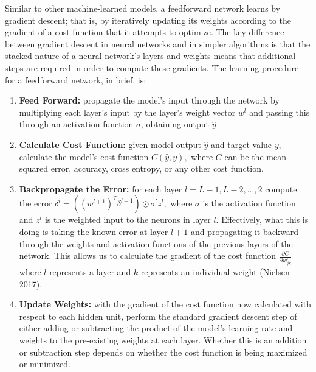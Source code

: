 \documentclass[12pt]{article}  %
\theoremstyle{definition}
\theoremstyle{remark}
\begin{document}
\par Similar to other machine-learned models, a feedforward network learns by gradient descent; that is, by iteratively updating its weights according to the gradient of a cost function that it attempts to optimize. The key difference between gradient descent in neural networks and in simpler algorithms is that the stacked nature of a neural network's layers and weights means that additional steps are required in order to compute these gradients. The learning procedure for a feedforward network, in brief, is: 

\begin{enumerate}[{1}]
   \item \textbf{Feed Forward:} propagate the model's input through the network by multiplying each layer's input by the layer's weight vector $w^l$ and passing this through an activation function $\sigma$, obtaining output $\hat{y}$
  
   \item \textbf{Calculate Cost Function:} given model output $\hat{y}$ and target value $y$, calculate the model's cost function $C(\hat{y}, y),$ where $C$ can be the mean squared error, accuracy, cross entropy, or any other cost function. 
 
   \item \textbf{Backpropagate the Error:} for each layer $l=L-1, L-2, ..., 2$ compute the error $\delta^{l}=((w^{l+1})^T\delta^{l+1})\odot \sigma^{\prime}z^{l},$ where $\sigma$ is the activation function and $z^l$ is the weighted input to the neurons in layer $l$. Effectively, what this is doing is taking the known error at layer $l+1$ and propagating it backward through the weights and activation functions of the previous layers of the network. This allows us to calculate the gradient of the cost function $\frac{\partial{C}}{\partial{w^{l}_{jk}}}$ where $l$ represents a layer and $k$ represents an individual weight (Nielsen 2017). 
    
   \item \textbf{Update Weights:} with the gradient of the cost function now calculated with respect to each hidden unit, perform the standard gradient descent step of either adding or subtracting the product of the model's learning rate and weights to the pre-existing weights at each layer. Whether this is an addition or subtraction step depends on whether the cost function is being maximized or minimized. 
\end{enumerate}
\end{document}
